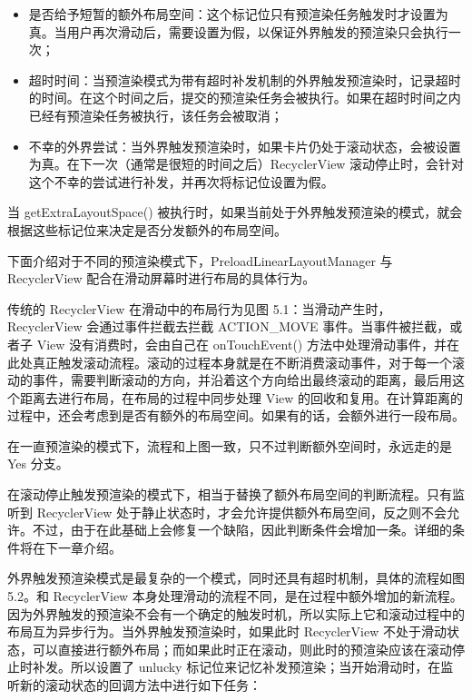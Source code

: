 \begin{itemize}
    \item 是否给予短暂的额外布局空间：这个标记位只有预渲染任务触发时才设置为真。当用户再次滑动后，需要设置为假，以保证外界触发的预渲染只会执行一次；
    \item 超时时间：当预渲染模式为带有超时补发机制的外界触发预渲染时，记录超时的时间。在这个时间之后，提交的预渲染任务会被执行。如果在超时时间之内已经有预渲染任务被执行，该任务会被取消；
    \item 不幸的外界尝试：当外界触发预渲染时，如果卡片仍处于滚动状态，会被设置为真。在下一次（通常是很短的时间之后）RecyclerView 滚动停止时，会针对这个不幸的尝试进行补发，并再次将标记位设置为假。
\end{itemize}

当 getExtraLayoutSpace() 被执行时，如果当前处于外界触发预渲染的模式，就会根据这些标记位来决定是否分发额外的布局空间。

下面介绍对于不同的预渲染模式下，PreloadLinearLayoutManager 与 RecyclerView 配合在滑动屏幕时进行布局的具体行为。

传统的 RecyclerView 在滑动中的布局行为见图 5.1：当滑动产生时，RecyclerView 会通过事件拦截去拦截 ACTION\_MOVE 事件。当事件被拦截，或者子 View 没有消费时，会由自己在 onTouchEvent() 方法中处理滑动事件，并在此处真正触发滚动流程。滚动的过程本身就是在不断消费滚动事件，对于每一个滚动的事件，需要判断滚动的方向，并沿着这个方向给出最终滚动的距离，最后用这个距离去进行布局，在布局的过程中同步处理 View 的回收和复用。在计算距离的过程中，还会考虑到是否有额外的布局空间。如果有的话，会额外进行一段布局。



在一直预渲染的模式下，流程和上图一致，只不过判断额外空间时，永远走的是 Yes 分支。

在滚动停止触发预渲染的模式下，相当于替换了额外布局空间的判断流程。只有监听到 RecyclerView 处于静止状态时，才会允许提供额外布局空间，反之则不会允许。不过，由于在此基础上会修复一个缺陷，因此判断条件会增加一条。详细的条件将在下一章介绍。

外界触发预渲染模式是最复杂的一个模式，同时还具有超时机制，具体的流程如图 5.2。和 RecyclerView 本身处理滑动的流程不同，是在过程中额外增加的新流程。因为外界触发的预渲染不会有一个确定的触发时机，所以实际上它和滚动过程中的布局互为异步行为。当外界触发预渲染时，如果此时 RecyclerView 不处于滑动状态，可以直接进行额外布局；而如果此时正在滚动，则此时的预渲染应该在滚动停止时补发。所以设置了 unlucky 标记位来记忆补发预渲染；当开始滑动时，在监听新的滚动状态的回调方法中进行如下任务：

